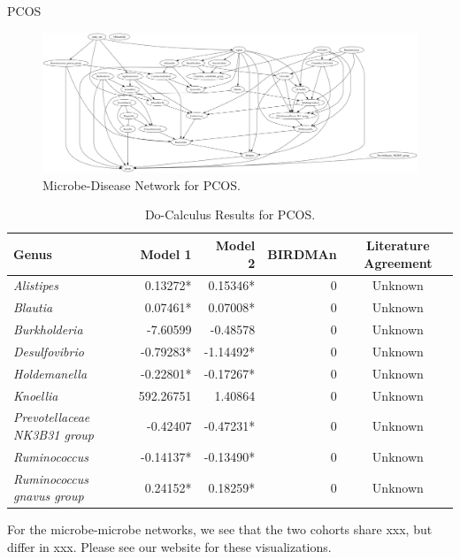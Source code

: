 \documentclass[final]{beamer}
\newlength{\colwidth}
\begin{document}
\begin{frame}[t]
\begin{columns}[t]
\begin{column}{\colwidth}
\begin{block}{PCOS}
    \begin{figure}
      \centering
      \includegraphics[width=\linewidth]{../graphs/pcos/cdnod_norm.png}
      \caption{Microbe-Disease Network for PCOS.}
    \end{figure}
    
    \begin{table}
      \centering
      \begin{tabular}{l r r r c}
        \toprule
        \textbf{Genus} & \textbf{Model 1} & \textbf{Model 2} & \textbf{BIRDMAn} & \textbf{Literature Agreement} \\
        \midrule
        \textit{Alistipes} & 0.13272* & 0.15346* & 0 & Unknown \\
        \textit{Blautia} & 0.07461* & 0.07008* & 0 & Unknown \\
        \textit{Burkholderia} & -7.60599 & -0.48578 & 0 & Unknown \\
        \textit{Desulfovibrio} & -0.79283* & -1.14492* & 0 & Unknown \\
        \textit{Holdemanella} & -0.22801* & -0.17267* & 0 & Unknown \\
        \textit{Knoellia} & 592.26751 & 1.40864 & 0 & Unknown \\
        \textit{Prevotellaceae NK3B31 group} & -0.42407 & -0.47231* & 0 & Unknown \\
        \textit{Ruminococcus} & -0.14137* & -0.13490* & 0 & Unknown \\
        \textit{Ruminococcus gnavus group} & 0.24152* & 0.18259* & 0 & Unknown \\
        \bottomrule
      \end{tabular}
      \caption{Do-Calculus Results for PCOS.}
    \end{table}
    
    For the microbe-microbe networks, we see that the two cohorts share xxx, but differ in xxx. Please see our website for these visualizations. \\


\end{block}
\end{column}
\end{columns}
\end{frame}
\end{document}
